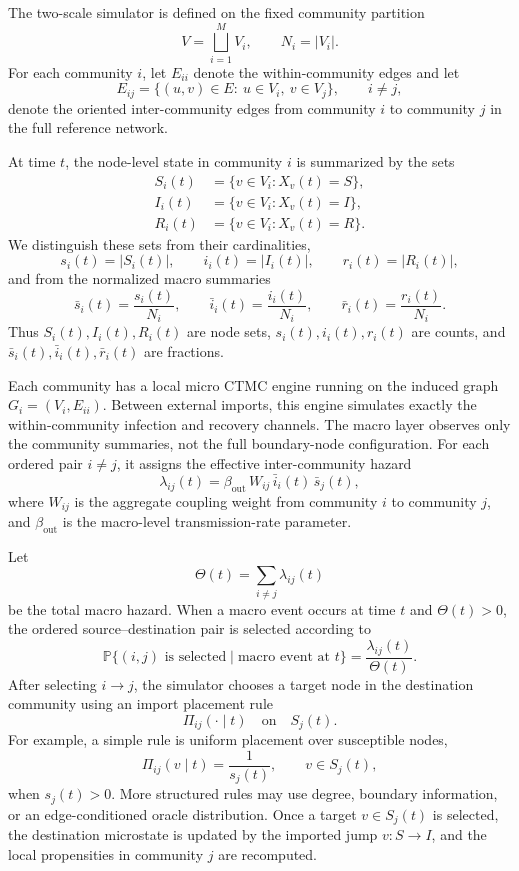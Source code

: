 \documentclass[12pt,a4paper]{article}
\begin{document}
The two-scale simulator is defined on the fixed community partition
\[
V=\bigsqcup_{i=1}^{M}V_i,
\qquad N_i=|V_i|.
\]
For each community \(i\), let \(E_{ii}\) denote the within-community edges and let
\[
E_{ij}=\{(u,v)\in E:\ u\in V_i,\ v\in V_j\},
\qquad i\neq j,
\]
denote the oriented inter-community edges from community \(i\) to community \(j\) in the full reference network.

At time \(t\), the node-level state in community \(i\) is summarized by the sets
\[
\begin{aligned}
S_i(t) &= \{v\in V_i : X_v(t)=S\},\\
I_i(t) &= \{v\in V_i : X_v(t)=I\},\\
R_i(t) &= \{v\in V_i : X_v(t)=R\}.
\end{aligned}
\]
We distinguish these sets from their cardinalities,
\[
s_i(t)=|S_i(t)|,\qquad i_i(t)=|I_i(t)|,\qquad r_i(t)=|R_i(t)|,
\]
and from the normalized macro summaries
\[
\bar{s}_i(t)=\frac{s_i(t)}{N_i},\qquad
\bar{i}_i(t)=\frac{i_i(t)}{N_i},\qquad
\bar{r}_i(t)=\frac{r_i(t)}{N_i}.
\]
Thus \(S_i(t),I_i(t),R_i(t)\) are node sets, \(s_i(t),i_i(t),r_i(t)\) are counts, and \(\bar{s}_i(t),\bar{i}_i(t),\bar{r}_i(t)\) are fractions.

Each community has a local micro CTMC engine running on the induced graph \(G_i=(V_i,E_{ii})\). Between external imports, this engine simulates exactly the within-community infection and recovery channels. The macro layer observes only the community summaries, not the full boundary-node configuration. For each ordered pair \(i\neq j\), it assigns the effective inter-community hazard
\[
\lambda_{ij}(t)
=\beta_{\mathrm{out}}\,W_{ij}\,\bar{i}_i(t)\,\bar{s}_j(t),
\]
where \(W_{ij}\) is the aggregate coupling weight from community \(i\) to community \(j\), and \(\beta_{\mathrm{out}}\) is the macro-level transmission-rate parameter.

Let
\[
\Theta(t)=\sum_{i\neq j}\lambda_{ij}(t)
\]
be the total macro hazard. When a macro event occurs at time \(t\) and \(\Theta(t)>0\), the ordered source--destination pair is selected according to
\[
\mathbb P\{(i,j)\text{ is selected}\mid\text{macro event at }t\}
=\frac{\lambda_{ij}(t)}{\Theta(t)}.
\]
After selecting \(i\to j\), the simulator chooses a target node in the destination community using an import placement rule
\[
\Pi_{ij}(\cdot\mid t)
\quad\text{on}\quad S_j(t).
\]
For example, a simple rule is uniform placement over susceptible nodes,
\[
\Pi_{ij}(v\mid t)=\frac{1}{s_j(t)},\qquad v\in S_j(t),
\]
when \(s_j(t)>0\). More structured rules may use degree, boundary information, or an edge-conditioned oracle distribution. Once a target \(v\in S_j(t)\) is selected, the destination microstate is updated by the imported jump \(v:S\to I\), and the local propensities in community \(j\) are recomputed.
\end{document}
